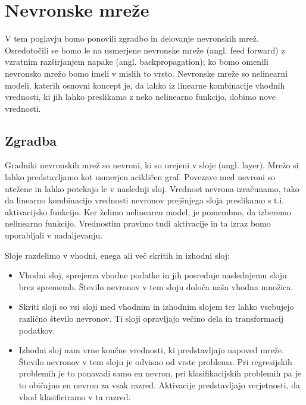 \chapter{Nevronske mreže}
V tem poglavju bomo ponovili zgradbo in delovanje nevronskih mrež. Osredotočili se bomo le na  usmerjene nevronske mreže (angl. feed forward) z vzratnim razširjanjem napake (angl. backpropagation); ko bomo omenili nevronsko mrežo bomo imeli v mislih to vrsto.
Nevronske mreže so nelinearni modeli, katerih osnovni koncept je, da lahko iz linearne kombinacije vhodnih vrednosti, ki jih lahko preslikamo z neko nelinearno funkcijo, dobimo nove vrednosti.\cite{Hastie2009}


\section{Zgradba}
Gradniki nevronskih mrež so nevroni, ki so urejeni v sloje (angl. layer).
Mrežo si lahko predstavljamo kot usmerjen acikličen graf. Povezave med nevroni so utežene in lahko potekajo le v naslednji sloj.
Vrednost nevrona izračunamo, tako da linearno kombinacijo vrednosti nevronov prejšnjega sloja preslikamo s t.i. aktivacijsko funkcijo. Ker želimo nelinearen model, je pomembno, da izberemo nelinearno funkcijo. Vrednostim pravimo tudi aktivacije in ta izraz bomo uporabljali v nadaljevanju.

Sloje razdelimo v vhodni, enega ali več skritih in izhodni sloj:
\begin{itemize}
    \item Vhodni sloj, sprejema vhodne podatke in jih posreduje naslednjemu sloju brez sprememb. Število nevronov v tem sloju določa naša vhodna množica.
    \item Skriti sloji so vsi sloji med vhodnim in izhodnim slojem ter lahko vsebujejo različno število nevronov. Ti sloji opravljajo večino dela in transformacij podatkov.
    \item Izhodni sloj nam vrne končne vrednosti, ki predstavljajo napoved mreže. Število nevronov v tem sloju je odvisno od vrste problema. Pri regresijskih problemih je to ponavadi samo en nevron, pri klasifikacijskih problemih pa je to običajno en nevron za vsak razred. Aktivacije predstavljajo verjetnosti, da vhod klasificiramo v ta razred.
\end{itemize}



